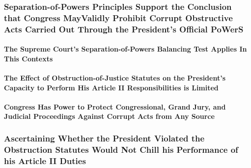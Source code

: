 \subsubsection{Separation-of-Powers Principles Support the Conclusion that Congress MayValidly Prohibit Corrupt Obstructive Acts Carried Out Through the President’s Official PoWerS}

\paragraph{The Supreme Court’s Separation-of-Powers Balancing Test Applies In This Contexts}

\paragraph{The Effect of Obstruction-of-Justice Statutes on the President’s Capacity to Perform His Article II Responsibilities is Limited}

\paragraph{Congress Has Power to Protect Congressional, Grand Jury, and Judicial Proceedings Against Corrupt Acts from Any Source}

\subsubsection{Ascertaining Whether the President Violated the Obstruction Statutes Would Not Chill his Performance of his Article II Duties}
